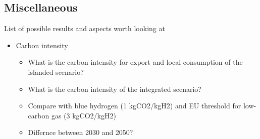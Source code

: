 \subsection{Miscellaneous}
List of possible results and aspects worth looking at
\begin{itemize}
    \item Carbon intensity
    \begin{itemize}
        \item What is the carbon intensity for export and local consumption of the islanded scenario? 
        \item What is the carbon intensity of the integrated scenario?
        \item Compare with blue hydrogen (1 kgCO2/kgH2) and EU threshold for low-carbon gas (3 kgCO2/kgH2)
        \item Differnce between 2030 and 2050?
    \end{itemize}
\end{itemize}
